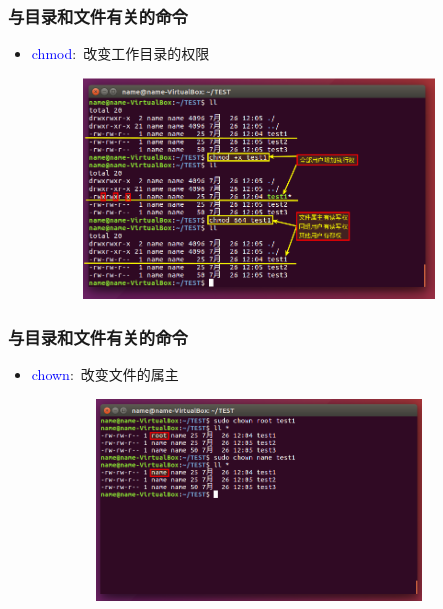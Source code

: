 \frame
{
	\frametitle{与目录和文件有关的命令}
	\begin{itemize}
		\item \textcolor{blue}{chmod}:~改变工作目录的权限
\begin{figure}[h!]
\centering
\vspace{-9.5pt}
\includegraphics[height=2.3in,width=3.9in,viewport=0 0 800 470,clip]{Figures/Ubuntu-chmod.png}
\label{Linux-command-chmod}
\end{figure}
	\end{itemize}
}

\frame
{
	\frametitle{与目录和文件有关的命令}
	\begin{itemize}
		\item \textcolor{blue}{chown}:~改变文件的属主
\begin{figure}[h!]
\centering
\vspace{-2.5pt}
\includegraphics[height=2.1in,width=3.9in,viewport=0 70 800 470,clip]{Figures/Ubuntu-chown.png}
\label{Linux-command-chown}
\end{figure}
	\end{itemize}
}

